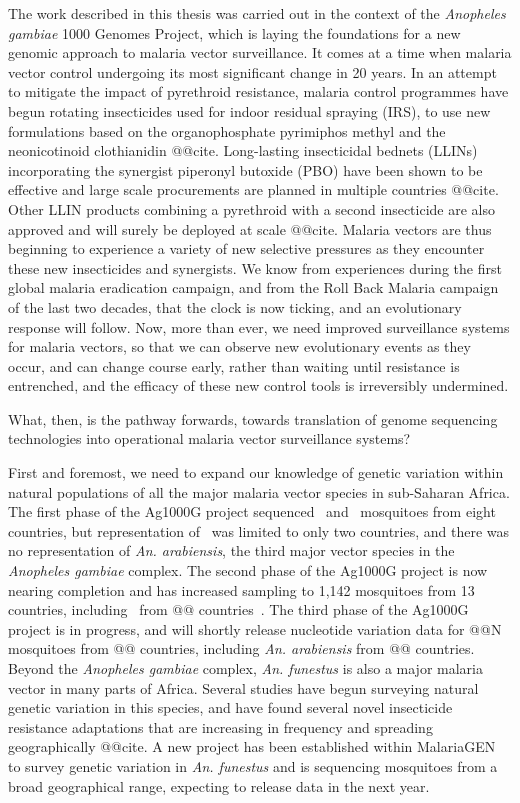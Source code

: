 \documentclass[a4paper,11pt,abstracton,hidelinks]{scrartcl}
\begin{document}
The work described in this thesis was carried out in the context of the \textit{Anopheles gambiae} 1000 Genomes Project, which is laying the foundations for a new genomic approach to malaria vector surveillance.
%
It comes at a time when malaria vector control undergoing its most significant change in 20 years.
%
In an attempt to mitigate the impact of pyrethroid resistance, malaria control programmes have begun rotating insecticides used for indoor residual spraying (IRS), to use new formulations based on the organophosphate pyrimiphos methyl and the neonicotinoid clothianidin @@cite.
%
Long-lasting insecticidal bednets (LLINs) incorporating the synergist piperonyl butoxide (PBO) have been shown to be effective and large scale procurements are planned in multiple countries @@cite.
%
Other LLIN products combining a pyrethroid with a second insecticide are also approved and will surely be deployed at scale @@cite.
%
Malaria vectors are thus beginning to experience a variety of new selective pressures as they encounter these new insecticides and synergists.
%
We know from experiences during the first global malaria eradication campaign, and from the Roll Back Malaria campaign of the last two decades, that the clock is now ticking, and an evolutionary response will follow.
%
Now, more than ever, we need improved surveillance systems for malaria vectors, so that we can observe new evolutionary events as they occur, and can change course early, rather than waiting until resistance is entrenched, and the efficacy of these new control tools is irreversibly undermined.


What, then, is the pathway forwards, towards translation of genome sequencing technologies into operational malaria vector surveillance systems?


First and foremost, we need to expand our knowledge of genetic variation within natural populations of all the major malaria vector species in sub-Saharan Africa.
%
The first phase of the Ag1000G project sequenced \agam\ and \acol\ mosquitoes from eight countries, but representation of \acol\ was limited to only two countries, and there was no representation of \textit{An. arabiensis}, the third major vector species in the \textit{Anopheles gambiae} complex.
%
The second phase of the Ag1000G project is now nearing completion and has increased sampling to 1,142 mosquitoes from 13 countries, including \acol\ from @@ countries~\parencite{Ag1000G2020}.
%
The third phase of the Ag1000G project is in progress, and will shortly release nucleotide variation data for @@N mosquitoes from @@ countries, including \textit{An. arabiensis} from @@ countries.
%
Beyond the \textit{Anopheles gambiae} complex, \textit{An. funestus} is also a major malaria vector in many parts of Africa.
%
Several studies have begun surveying natural genetic variation in this species, and have found several novel insecticide resistance adaptations that are increasing in frequency and spreading geographically @@cite.
%
A new project has been established within MalariaGEN to survey genetic variation in \textit{An. funestus} and is sequencing mosquitoes from a broad geographical range, expecting to release data in the next year.
\end{document}
